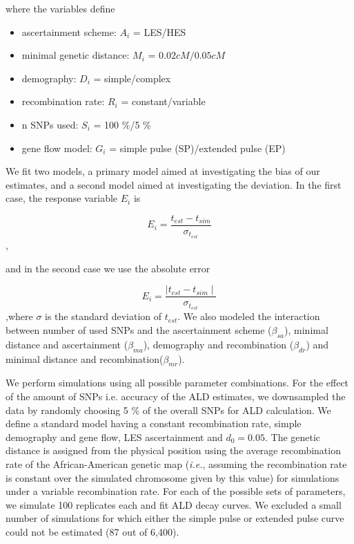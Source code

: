 \documentclass[11pt]{article}
\begin{document}
where the variables define
\begin{itemize} 
    \item ascertainment scheme: $A_i$ = LES/HES
    \item minimal genetic distance: $M_i$ = $0.02 cM/ 0.05 cM$
    \item demography: $D_i$ = simple/complex
    \item recombination rate: $R_i$ = constant/variable
    \item n SNPs used: $S_i$ = 100 \%/5 \%
    \item gene flow model: $G_i$ = simple pulse (SP)/extended pulse (EP)
\end{itemize}

We fit two models, a primary model  aimed at investigating the bias of our estimates, and a second model aimed at investigating the deviation. In the first case, the response variable $E_i$ is

$$E_i = \frac{t_{est} - t_{sim}}{\sigma_{t_{est}}}$$, 

and in the second case we use the absolute error 

$$E_i = \frac{\mid t_{est} - t_{sim} \mid}{\sigma_{t_{est}}}$$,where $\sigma$ is the standard deviation of $t_{est}$.  We also modeled the interaction between number of used SNPs and the ascertainment scheme ($\beta_{sa}$), minimal distance and ascertainment ($\beta_{ma}$), demography and recombination ($\beta_{dr}$) and minimal distance and recombination($\beta_{mr}$).

We perform simulations using all possible parameter combinations. For the effect of the amount of SNPs i.e. accuracy of the ALD estimates, we downsampled the data by randomly choosing 5 \% of the overall SNPs for ALD calculation.
We define a standard model having a constant recombination rate, simple demography and gene flow, LES ascertainment and $d_0 = 0.05$.
The genetic distance is assigned from the physical  position using the average recombination rate of the African-American genetic map (\emph{i.e.}, assuming the recombination rate is constant over the simulated chromosome given by this value) for simulations under a variable recombination rate.
For each of the possible sets of parameters, we simulate 100 replicates each and fit ALD decay curves. We excluded a small number of simulations for which either the simple pulse or extended pulse  curve could not be estimated (87 out of 6,400). 
\end{document}
